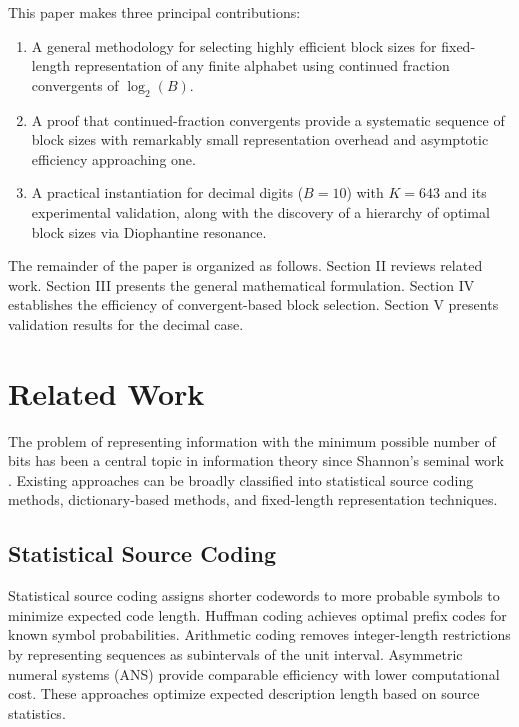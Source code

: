 \documentclass[10pt, onecolumn]{IEEEtran}
\begin{document}
This paper makes three principal contributions:

\begin{enumerate}

\item A general methodology for selecting highly efficient block sizes for fixed-length representation of any finite alphabet using continued fraction convergents of $\log_2(B)$.

\item A proof that continued-fraction convergents provide a systematic sequence of block sizes with remarkably small representation overhead and asymptotic efficiency approaching one.

\item A practical instantiation for decimal digits ($B=10$) with $K=643$ and its experimental validation, along with the discovery of a hierarchy of optimal block sizes via Diophantine resonance.

\end{enumerate}

The remainder of the paper is organized as follows. Section II reviews related work. Section III presents the general mathematical formulation. Section IV establishes the efficiency of convergent-based block selection. Section V presents validation results for the decimal case.

\section{Related Work}

The problem of representing information with the minimum possible number of bits has been a central topic in information theory since Shannon's seminal work \cite{shannon}. Existing approaches can be broadly classified into statistical source coding methods, dictionary-based methods, and fixed-length representation techniques.

\subsection{Statistical Source Coding}

Statistical source coding assigns shorter codewords to more probable symbols to minimize expected code length. Huffman coding \cite{huffman} achieves optimal prefix codes for known symbol probabilities. Arithmetic coding \cite{rissanen, witten1987} removes integer-length restrictions by representing sequences as subintervals of the unit interval. Asymmetric numeral systems (ANS) \cite{duda} provide comparable efficiency with lower computational cost. These approaches optimize expected description length based on source statistics.
\end{document}
